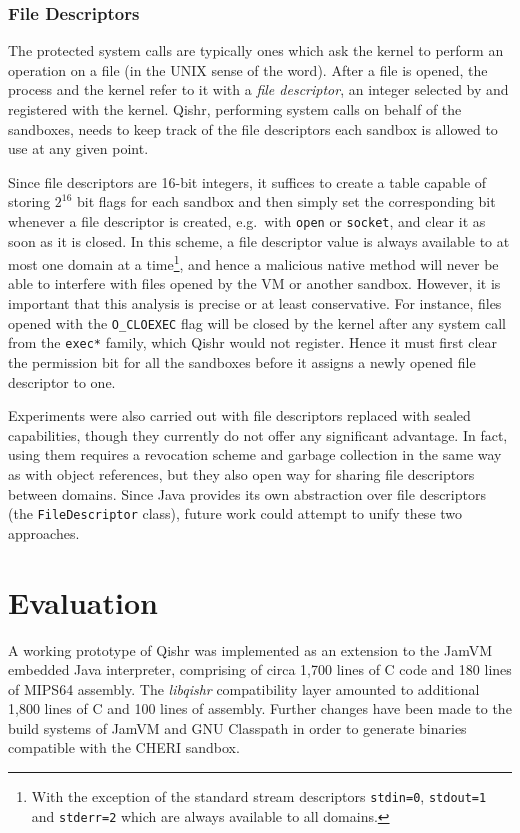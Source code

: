 \documentclass[a4paper,12pt,twoside,openright]{report}
\newcommand{\class}[1]{\texttt{#1}}
\newcommand{\tool}[1]{\emph{#1}}
\newcommand{\lib}[1]{\tool{lib#1}}
\begin{document}
\subsection{File Descriptors}

The protected system calls are typically ones which ask the kernel to perform an operation on a file (in the UNIX sense of the word). After a file is opened, the process and the kernel refer to it with a \emph{file descriptor}, an integer selected by and registered with the kernel. Qishr, performing system calls on behalf of the sandboxes, needs to keep track of the file descriptors each sandbox is allowed to use at any given point.

Since file descriptors are 16-bit integers, it suffices to create a table capable of storing $2^{16}$ bit flags for each sandbox and then simply set the corresponding bit whenever a file descriptor is created, e.g.\ with \texttt{open} or \texttt{socket}, and clear it as soon as it is closed. In this scheme, a file descriptor value is always available to at most one domain at a time\footnote{With the exception of the standard stream descriptors \texttt{stdin=0}, \texttt{stdout=1} and \texttt{stderr=2} which are always available to all domains.}, and hence a malicious native method will never be able to interfere with files opened by the VM or another sandbox. However, it is important that this analysis is precise or at least conservative. For instance, files opened with the \texttt{O\_CLOEXEC} flag will be closed by the kernel after any system call from the \texttt{exec*} family, which Qishr would not register. Hence it must first clear the permission bit for all the sandboxes before it assigns a newly opened file descriptor to one.

Experiments were also carried out with file descriptors replaced with sealed capabilities, though they currently do not offer any significant advantage. In fact, using them requires a revocation scheme and garbage collection in the same way as with object references, but they also open way for sharing file descriptors between domains. Since Java provides its own abstraction over file descriptors (the \class{FileDescriptor} class), future work could attempt to unify these two approaches.

\chapter{Evaluation} 

A working prototype of Qishr was implemented as an extension to the JamVM embedded Java interpreter, comprising of circa 1,700 lines of C code and 180 lines of MIPS64 assembly. The \lib{qishr} compatibility layer amounted to additional 1,800 lines of C and 100 lines of assembly. Further changes have been made to the build systems of JamVM and GNU Classpath in order to generate binaries compatible with the CHERI sandbox.
\end{document}
